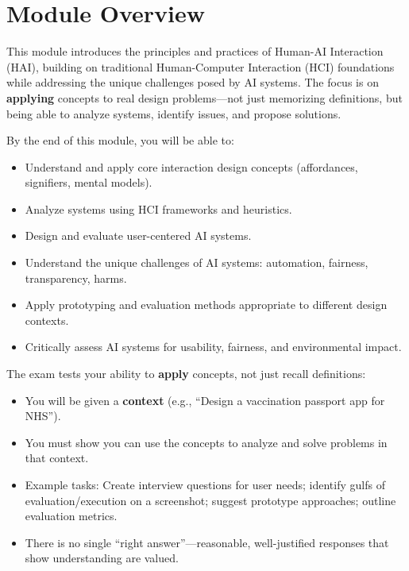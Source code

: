 \section*{Module Overview}

\begin{keybox}[Introduction]
This module introduces the principles and practices of Human-AI Interaction (HAI), building on traditional Human-Computer Interaction (HCI) foundations while addressing the unique challenges posed by AI systems. The focus is on \textbf{applying} concepts to real design problems---not just memorizing definitions, but being able to analyze systems, identify issues, and propose solutions.
\end{keybox}

\begin{keybox}
By the end of this module, you will be able to:
\begin{itemize}
  \item Understand and apply core interaction design concepts (affordances, signifiers, mental models).
  \item Analyze systems using HCI frameworks and heuristics.
  \item Design and evaluate user-centered AI systems.
  \item Understand the unique challenges of AI systems: automation, fairness, transparency, harms.
  \item Apply prototyping and evaluation methods appropriate to different design contexts.
  \item Critically assess AI systems for usability, fairness, and environmental impact.
\end{itemize}
\end{keybox}

\begin{keybox}
The exam tests your ability to \textbf{apply} concepts, not just recall definitions:
\begin{itemize}
  \item You will be given a \textbf{context} (e.g., ``Design a vaccination passport app for NHS'').
  \item You must show you can use the concepts to analyze and solve problems in that context.
  \item Example tasks: Create interview questions for user needs; identify gulfs of evaluation/execution on a screenshot; suggest prototype approaches; outline evaluation metrics.
  \item There is no single ``right answer''---reasonable, well-justified responses that show understanding are valued.
\end{itemize}
\end{keybox}

